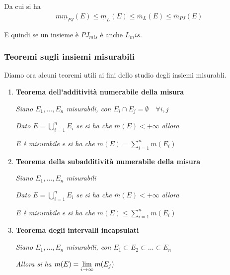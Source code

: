 Da cui si ha
\begin{align}
	m\underline{m}_{PJ}(E) \leq \underline{m}_{L}(E) \leq \overline{m}_{L}(E) \leq \overline{m}_{PJ}(E)
\end{align}

E quindi se un insieme è $PJ_{mis}$ è anche $L_mis$.

\begin{figure}[!htb]
\end{figure}

\newpage

\subsubsection{Teoremi sugli insiemi misurabili}

Diamo ora alcuni teoremi utili ai fini dello studio degli insiemi misurabli.

\begin{enumerate}
	\item \textbf{Teorema dell'additività numerabile della misura}
	
	\textit{Siano $E_1, \dots , E_n$ misurabili, con $E_i \cap E_j =\emptyset \quad \forall i,j$}
	
	\textit{Dato $E= \bigcup_{i=1}^{n} E_i$ se si ha che $\overline{m}(E)< +\infty$ allora}
	
	\textit{E è misurabile e si ha che $m(E)= \sum_{i=1}^{n} m(E_i)$}
	
	\item \textbf{Teorema della subadditività numerabile della misura}
	
	\textit{Siano $E_1, \dots , E_n$ misurabili}
	
	\textit{Dato $E= \bigcup_{i=1}^{n} E_i$ se si ha che $\overline{m}(E)< +\infty$ allora}
	
	\textit{E è misurabile e si ha che $m(E)\leq \sum_{i=1}^{n} m(E_i)$}
	
	\item \textbf{Teorema degli intervalli incapsulati}
	
	\textit{Siano $E_1, \dots , E_n$ misurabili, con $E_1 \subset E_2 \subset \dots \subset E_n$}
	
	\textit{Allora si ha $m(E)= \underset{i \rightarrow \infty}{\lim} \, m(E_j)$}
\end{enumerate}

